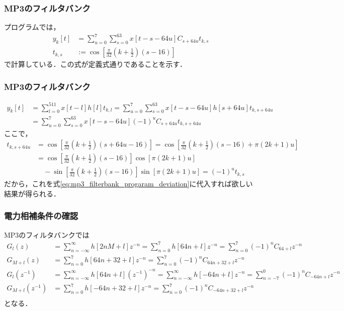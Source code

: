 \documentclass[17pt,xcolor=dvipsnames,table,dvipdfmx]{beamer}
\begin{document}
\begin{frame}[c]
    \frametitle{MP3のフィルタバンク}
    プログラムでは，
    \begin{align*}
        y_{k}[t] &= \sum_{u = 0}^{7} \sum_{s = 0}^{63} x[t - s - 64u] C_{s + 64u} t_{k,s} \\
        t_{k,s} &:= \cos\left[ \frac{\pi}{32}\left( k + \frac{1}{2} \right) \left( s - 16 \right) \right]
    \end{align*}
    で計算している．この式が定義式通りであることを示す．
\end{frame}

\begin{frame}[c]
    \frametitle{MP3のフィルタバンク}
    \scriptsize
    \begin{align}
        y_{k}[t] &= \sum_{l = 0}^{511} x[t - l] h[l] t_{k,l} = \sum_{u = 0}^{7} \sum_{s = 0}^{63} x[t - s - 64u] h[s + 64u] t_{k,s+64u} \nonumber \\
        &= \sum_{u = 0}^{7} \sum_{s = 0}^{63} x[t - s - 64u] (-1)^{u} C_{s + 64u} t_{k,s+64u} \label{eq:mp3_filterbank_progaram_deviation}
    \end{align}
    ここで，
    \begin{align*}
        t_{k,s+64u} &= \cos\left[ \frac{\pi}{32} \left( k + \frac{1}{2} \right) (s + 64u - 16) \right] = \cos\left[ \frac{\pi}{32} \left( k + \frac{1}{2} \right) (s - 16) + \pi \left( 2k + 1 \right) u \right] \\
        &= \cos\left[ \frac{\pi}{32} \left( k + \frac{1}{2} \right) (s - 16) \right]\cos\left[ \pi(2k + 1)u \right] \\
        &\quad - \sin\left[ \frac{\pi}{32} \left( k + \frac{1}{2} \right) (s - 16) \right]\sin\left[ \pi(2k + 1)u \right]
        = (-1)^{u} t_{k,s}
    \end{align*}
    だから，これを式\eqref{eq:mp3_filterbank_progaram_deviation}に代入すれば欲しい結果が得られる．
\end{frame}

\begin{frame}[c]
    \frametitle{電力相補条件の確認}
    \scriptsize
    MP3のフィルタバンクでは
    \begin{align*}
        G_{l}(z) &= \sum_{n = -\infty}^{\infty} h[2nM + l] z^{-n} = \sum_{n = 0}^{7} h[64n + l] z^{-n} = \sum_{n = 0}^{7} (-1)^{n} C_{64 + l} z^{-n} \\
        G_{M+l}(z) &= \sum_{n = 0}^{7} h[64n + 32 + l] z^{-n} = \sum_{n = 0}^{7} (-1)^{n} C_{64n + 32 + l} z^{-n} \\
        G_{l}(z^{-1}) &= \sum_{n = -\infty}^{\infty} h[64n + l] (z^{-1})^{-n} = \sum_{n = -\infty}^{\infty} h[-64n + l] z^{-n} = \sum_{n = -7}^{0} (-1)^{n} C_{-64n + l} z^{-n} \\
        G_{M+l}(z^{-1}) &= \sum_{n = 0}^{7} h[-64n + 32 + l] z^{-n} = \sum_{n = 0}^{7} (-1)^{n} C_{-64n + 32 + l} z^{-n} \\
    \end{align*}
    となる．
\end{frame}
\end{document}
